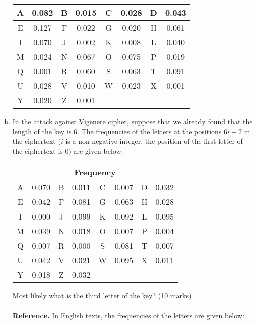 \documentclass[12pt]{article}
\begin{document}
\begin{enumerate}[(a)]
\begin{table}[H]
\begin{tabular}{|cc|cc|cc|cc|}
    A & 0.082 & B & 0.015 & C & 0.028 & D & 0.043 \\ \hline
    E & 0.127 & F & 0.022 & G & 0.020 & H & 0.061 \\ \hline
    I & 0.070 & J & 0.002 & K & 0.008 & L & 0.040 \\ \hline
    M & 0.024 & N & 0.067 & O & 0.075 & P & 0.019 \\ \hline
    Q & 0.001 & R & 0.060 & S & 0.063 & T & 0.091 \\ \hline
    U & 0.028 & V & 0.010 & W & 0.023 & X & 0.001 \\ \hline
    Y & 0.020 & Z & 0.001 & \multicolumn{4}{c|}{} \\ \hline
    \end{tabular}
    \end{table}
    \item In the attack against Vigenere cipher, suppose that we already found that the length of the key is 6. The frequencies of the letters at the positions $6i+2$ in the ciphertext ($i$ is a non-negative integer, the position of the first letter of the ciphertext is 0) are given below:
    \begin{table}[H]
    \centering
    \begin{tabular}{|cc|cc|cc|cc|}
    \hline
    \multicolumn{8}{|c|}{Frequency}               \\ \hline
    A & 0.070 & B & 0.011 & C & 0.007 & D & 0.032 \\ \hline
    E & 0.042 & F & 0.081 & G & 0.063 & H & 0.028 \\ \hline
    I & 0.000 & J & 0.099 & K & 0.092 & L & 0.095 \\ \hline
    M & 0.039 & N & 0.018 & O & 0.007 & P & 0.004 \\ \hline
    Q & 0.007 & R & 0.000 & S & 0.081 & T & 0.007 \\ \hline
    U & 0.042 & V & 0.021 & W & 0.095 & X & 0.011 \\ \hline
    Y & 0.018 & Z & 0.032 & \multicolumn{4}{c|}{} \\ \hline
    \end{tabular}
    \end{table}
    Most likely what is the third letter of the key? \hfill (10 marks)
\\\\\textbf{Reference.} In English texts, the frequencies of the letters are given below:    
    \begin{table}[H]
        \centering
        \begin{tabular}{|cc|cc|cc|cc|}

\end{tabular}
\end{table}
\end{enumerate}
\end{document}
